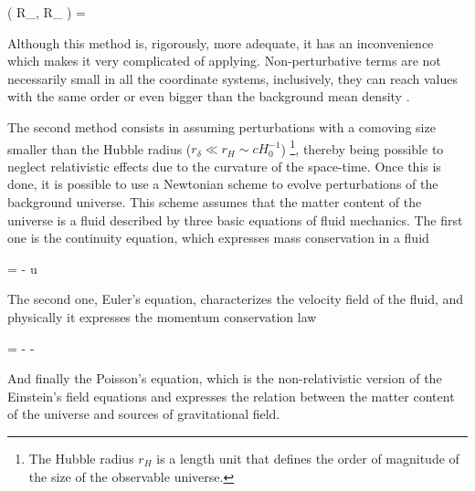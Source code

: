 { ( R_{\mu \nu}, \delta R_{\mu \nu} ) = 
 }


Although this method is, rigorously, more adequate, it has an inconvenience
which makes it very complicated of applying. Non-perturbative terms are 
not necessarily small in all the coordinate systems, inclusively, they can 
reach values with the same order or even bigger than the background mean 
density \cite{padmanabhan1995}.


The second method consists in assuming perturbations with a comoving size
smaller than the Hubble radius ($r_\delta \ll r_H \sim cH_0^{-1}$)
\footnote{The Hubble radius $r_H$ is a length unit that defines the 
order of magnitude of the size of the observable universe.}, thereby
being possible to neglect relativistic effects due to the curvature
of the space-time. Once this is done, it is possible to use a Newtonian
scheme to evolve perturbations of the background universe. This scheme
assumes that the matter content of the universe is a fluid described by
three basic equations of fluid mechanics. The first one is the continuity
equation, which expresses mass conservation in a fluid



{  = - \rho \nabla \cdot \bds u }


The second one, Euler's equation, characterizes the velocity field of the 
fluid, and physically it expresses the momentum conservation law


{  = - - \nabla \varphi }


And finally the Poisson's equation, which is the non-relativistic version
of the Einstein's field equations and expresses the relation between the
matter content of the universe and sources of gravitational field.

	
	
